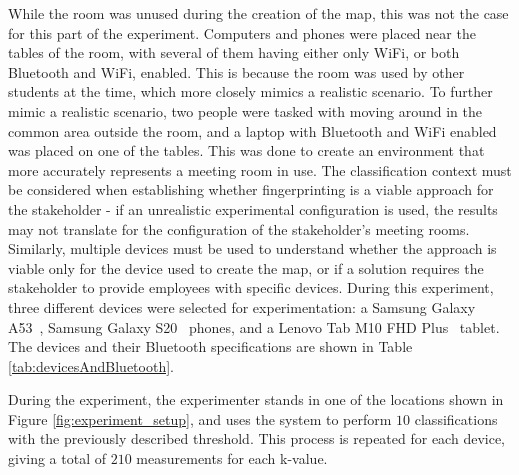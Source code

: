 While the room was unused during the creation of the map, this was not the case for this part of the experiment.
Computers and phones were placed near the tables of the room, with several of them having either only WiFi, or both Bluetooth and WiFi, enabled. 
This is because the room was used by other students at the time, which more closely mimics a realistic scenario.
To further mimic a realistic scenario, two people were tasked with moving around in the common area outside the room, and a laptop with Bluetooth and WiFi enabled was placed on one of the tables.
This was done to create an environment that more accurately represents a meeting room in use.
The classification context must be considered when establishing whether fingerprinting is a viable approach for the stakeholder - if an unrealistic experimental configuration is used, the results may not translate for the configuration of the stakeholder's meeting rooms. 
Similarly, multiple devices must be used to understand whether the approach is viable only for the device used to create the map, or if a solution requires the stakeholder to provide employees with specific devices. 
During this experiment, three different devices were selected for experimentation: a Samsung Galaxy A53~\cite{a53phone}, Samsung Galaxy S20~\cite{galaxy20phone} phones, and a Lenovo Tab M10 FHD Plus~\cite{tablet} tablet. 
The devices and their Bluetooth specifications are shown in Table \ref{tab:devicesAndBluetooth}.

\begin{table}[h!]
    \caption{The devices used in during classification and their supported Bluetooth version.}
    \label{tab:devicesAndBluetooth}
\end{table}

During the experiment, the experimenter stands in one of the locations shown in Figure \ref{fig:experiment_setup}, and uses the system to perform $10$ classifications with the previously described threshold.
This process is repeated for each device, giving a total of $210$ measurements for each k-value.